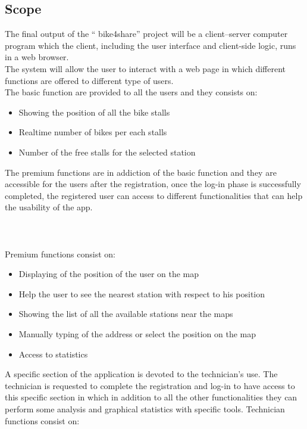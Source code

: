 \documentclass{article}
\begin{document}
\subsection{Scope}
The final output of the “ bike4share” project will be a client–server computer program which the client, including the user interface and client-side logic, runs in a web browser.\\
The system will allow  the user to interact with a web page in which different functions are offered to different type of users. \\
The basic function are provided to all the users and they consists on:
\begin{itemize}
    \item Showing the position of all the bike stalls
    \item Realtime number of bikes per each stalls
    \item Number of the free stalls for the selected station
\end{itemize}
The premium functions are in addiction of the basic function and they are  accessible for the users after the registration, once the log-in phase is successfully completed, the registered user can access to different functionalities that can help the usability of the app. \\\\\\\\
Premium functions consist on:
\begin{itemize}
    \item Displaying of the position of the user on the map
    \item Help the user to see the nearest station with respect to his position
    \item Showing the list of all the available  stations near the maps
    \item Manually typing of the address or select the position on the map  
    \item Access to statistics
\end{itemize}
A specific section of the application is devoted to the technician’s use. 
The technician is requested to complete the registration and log-in to have access to this specific section in which in addition to all the other functionalities they can perform some  analysis and  graphical statistics with specific tools.
Technician functions consist on:
\end{document}
